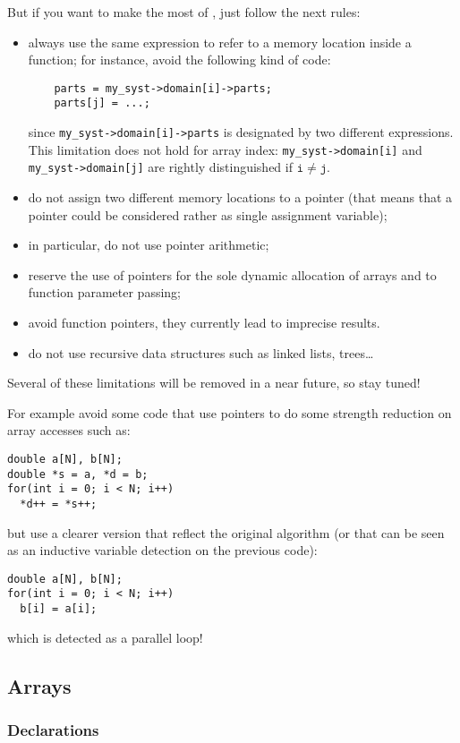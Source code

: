 \documentclass[a4paper]{article}
\begin{document}
But if you want to make the most of \Apfa, just follow the next rules:
\begin{itemize}
\item always use the same expression to refer to a memory location
  inside a function; for instance, avoid the following kind of code:
  \begin{lstlisting}
    parts = my_syst->domain[i]->parts;
    parts[j] = ...;
  \end{lstlisting}
  since \lstinline|my_syst->domain[i]->parts| is designated by two
  different expressions. This limitation does not hold for array
  index: \lstinline|my_syst->domain[i]| and
  \lstinline|my_syst->domain[j]| are rightly distinguished if
  $\mathtt{i} \neq \mathtt{j}$.
\item do not assign two different memory locations to a pointer (that
  means that a pointer could be considered rather as single assignment
  variable);
\item in particular, do not use pointer arithmetic;
\item reserve the use of pointers for the sole dynamic allocation of
  arrays and to function parameter passing;
\item avoid function pointers, they currently lead to imprecise results.
\item do not use recursive data structures such as linked lists, trees\ldots
\end{itemize}
Several of these limitations will be removed in a near future, so stay tuned!

For example avoid some code that use pointers to do some strength
reduction on array accesses such as:
\begin{lstlisting}
double a[N], b[N];
double *s = a, *d = b;
for(int i = 0; i < N; i++)
  *d++ = *s++;
\end{lstlisting}
but use a clearer version that reflect the original algorithm (or that can
be seen as an inductive variable detection on the previous code):
\begin{lstlisting}
double a[N], b[N];
for(int i = 0; i < N; i++)
  b[i] = a[i];
\end{lstlisting}
which is detected as a parallel loop!

\subsection{Arrays}
\label{sec:arrays}

\subsubsection{Declarations}
\label{sec:declarations}
\end{document}
